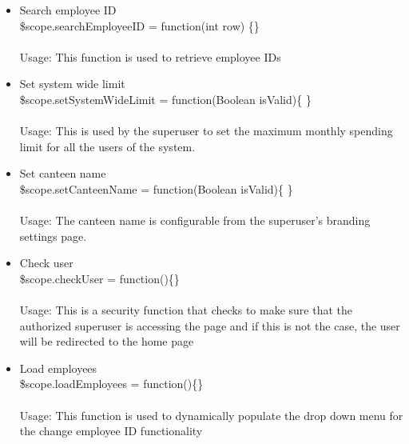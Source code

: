 \documentclass[a4paper,12pt]{article}
\begin{document}
\begin{enumerate}
\begin{itemize}
		\item Search employee ID \\ \$scope.searchEmployeeID = function(int row) \{\}
		\\ \\ Usage: This function is used to retrieve employee IDs 
		\item Set system wide limit \\ \$scope.setSystemWideLimit = function(Boolean isValid)\{ \} \\ \\ Usage: This is used by the superuser to set the maximum monthly spending limit for all the users of the system.
		 \item Set canteen name \\ \$scope.setCanteenName = function(Boolean isValid)\{ \}
		\\ \\ Usage: The canteen name is configurable from the superuser's branding settings page.
		\item Check user \\ \$scope.checkUser = function()\{\}
		\\ \\Usage: This is a security function that checks to make sure that the authorized superuser is accessing the page and if this is not the case, the user will be redirected to the home page
		\item Load employees \\ \$scope.loadEmployees = function()\{\}
		\\ \\Usage: This function is used to dynamically populate the drop down menu for the change employee ID functionality
	\end{itemize}
\end{enumerate} 
\end{document}
